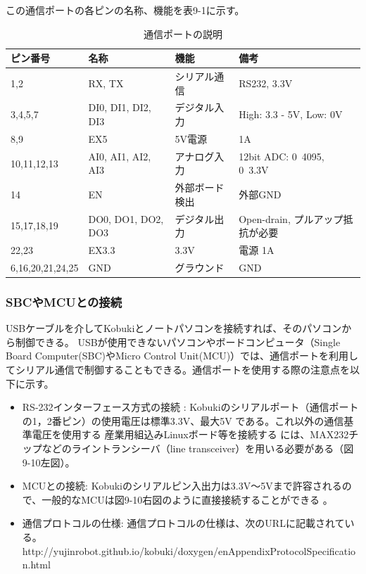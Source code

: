この通信ポートの各ピンの名称、機能を表9-1に示す。

\begin{table}[h]
\centering
\begin{tabular}{l l l l}
\toprule
\textbf{ピン番号} & \textbf{名称} & \textbf{機能} & \textbf{備考}\\
\midrule
1,2 & RX, TX  & シリアル通信  & RS232, 3.3V \\
3,4,5,7 & DI0, DI1, DI2, DI3  & デジタル入力  & High: 3.3 - 5V, Low: 0V \\
8,9 & EX5 & 5V電源  & 1A \\
10,11,12,13 & AI0, AI1, AI2, AI3  & アナログ入力  & 12bit ADC: 0~4095, 0~3.3V \\
14  & EN  & 外部ボード検出 & 外部GND \\
15,17,18,19 & DO0, DO1, DO2, DO3  & デジタル出力  & Open-drain, プルアップ抵抗が必要 \\
22,23 & EX3.3 & 3.3V & 電源 1A \\
6,16,20,21,24,25  & GND & グラウンド & GND \\
\bottomrule
\end{tabular}
\caption{通信ポートの説明}
\end{table}


\subsubsection{SBCやMCUとの接続}
USBケーブルを介してKobukiとノートパソコンを接続すれば、そのパソコンから制御できる。  USBが使用できないパソコンやボードコンピュータ（Single Board Computer(SBC)やMicro Control Unit(MCU)）では、通信ポートを利用してシリアル通信で制御することもできる。通信ポートを使用する際の注意点を以下に示す。

\begin{itemize}
\item RS-232インターフェース方式の接続  : Kobukiのシリアルポート（通信ポートの1，2番ピン）の使用電圧は標準3.3V、最大5V   である。これ以外の通信基準電圧を使用する 産業用組込みLinuxボード等を接続する   には、MAX232チップなどのライントランシーバ（line transceiver）を用いる必要がある（図9-10左図）。
\item MCUとの接続: Kobukiのシリアルピン入出力は3.3V〜5Vまで許容されるので、一般的なMCUは図9-10右図のように直接接続することができる  。
\item 通信プロトコルの仕様: 通信プロトコルの仕様は、次のURLに記載されている。http://yujinrobot.github.io/kobuki/doxygen/enAppendixProtocolSpecification.html
\end{itemize}

